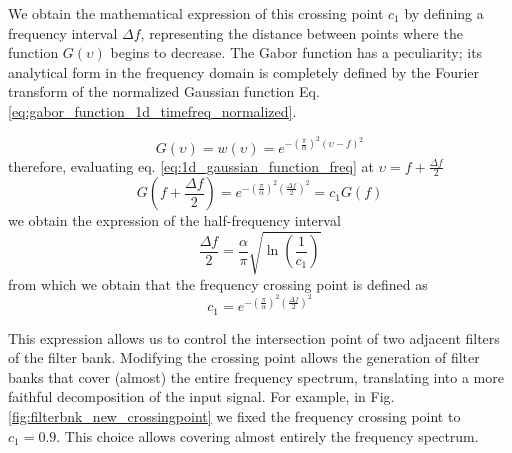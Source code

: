 \documentclass[journal]{IEEEtran}
\begin{document}
We obtain the mathematical expression of this crossing point $c_1$ by defining a frequency interval $\Delta f$, representing the distance between points where the function $G(\upsilon)$ begins to decrease. The Gabor function has a peculiarity;  its analytical form in the frequency domain is completely defined by the Fourier transform of the normalized Gaussian function Eq. \eqref{eq:gabor_function_1d_timefreq_normalized}.

\begin{equation}\label{eq:1d_gaussian_function_freq}
    G(\upsilon) = w(\upsilon) = e ^{-\left(\frac{\pi}{\alpha}\right) ^{2} (\upsilon-f)^2}
\end{equation}
therefore, evaluating eq. \eqref{eq:1d_gaussian_function_freq} at $\upsilon = f + \frac{\Delta f}{2}$
\begin{equation}\label{eq:constant_crossing_point}
    G\left(f + \frac{\Delta f}{2}\right) = e^{-\left(\frac{\pi}{\alpha}\right)^2 \left(\frac{\Delta f}{2}\right)^2} = c_1 G(f) 
\end{equation}
we obtain the expression of the half-frequency interval 
\begin{equation}\label{eq:frequency_interval_crossing_point}
    \frac{\Delta f}{2} = \frac{\alpha}{\pi}\sqrt{\ln \left(\frac{1}{c_1}\right)}
\end{equation}
from which we obtain that the frequency crossing point is defined as
\begin{equation}\label{eq:frequency_crossing_point}
    c_1 = e^{-\left(\frac{\pi}{\alpha} \right)^2 \left(\frac{\Delta f}{2}\right)^2 }
\end{equation}

This expression allows us to control the intersection point of two adjacent filters of the filter bank. Modifying the crossing point allows the generation of filter banks that cover (almost) the entire frequency spectrum, translating into a more faithful decomposition of the input signal. For example, in Fig. \ref{fig:filterbnk_new_crossingpoint} we fixed the frequency crossing point to $c_1=0.9$. This choice allows covering almost entirely the frequency spectrum.
 
\end{document}
